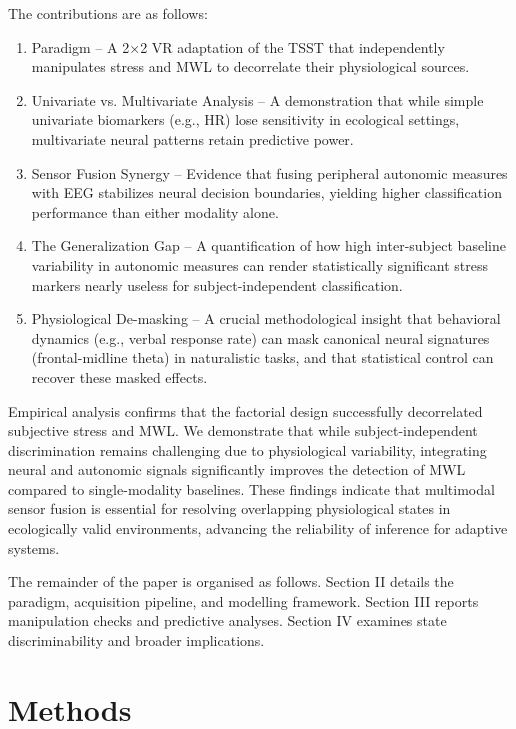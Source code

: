 \documentclass[lettersize,journal]{IEEEtran}
\begin{document}
The contributions are as follows:

\begin{enumerate}
\item Paradigm – A 2×2 VR adaptation of the TSST that independently manipulates stress and MWL to decorrelate their physiological sources.

\item Univariate vs. Multivariate Analysis – A demonstration that while simple univariate biomarkers (e.g., HR) lose sensitivity in ecological settings, multivariate neural patterns retain predictive power.

\item Sensor Fusion Synergy – Evidence that fusing peripheral autonomic measures with EEG stabilizes neural decision boundaries, yielding higher classification performance than either modality alone.

\item The Generalization Gap – A quantification of how high inter-subject baseline variability in autonomic measures can render statistically significant stress markers nearly useless for subject-independent classification.

\item Physiological De-masking – A crucial methodological insight that behavioral dynamics (e.g., verbal response rate) can mask canonical neural signatures (frontal-midline theta) in naturalistic tasks, and that statistical control can recover these masked effects.

\end{enumerate}

Empirical analysis confirms that the factorial design successfully decorrelated subjective stress and MWL. We demonstrate that while subject-independent discrimination remains challenging due to physiological variability, integrating neural and autonomic signals significantly improves the detection of MWL compared to single-modality baselines. These findings indicate that multimodal sensor fusion is essential for resolving overlapping physiological states in ecologically valid environments, advancing the reliability of inference for adaptive systems.

The remainder of the paper is organised as follows. Section II details the paradigm, acquisition pipeline, and modelling framework. Section III reports manipulation checks and predictive analyses. Section IV examines state discriminability and broader implications.


\section{Methods}
\end{document}
